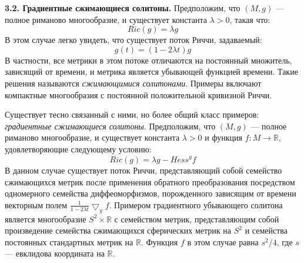 \textbf{3.2. Градиентные сжимающиеся солитоны.} Предположим, что 
$(M,g)$ — полное риманово многообразие, и существует константа 
$\lambda >0$, такая что:
\[
    Ric(g)=\lambda g
\]
В этом случае легко увидеть, что существует поток Риччи, задаваемый:
\[
    g(t)=(1-2\lambda t)g
\]
В частности, все метрики в этом потоке отличаются на постоянный множитель, 
зависящий от времени, и метрика является убывающей функцией времени. 
Такие решения называются \textit{сжимающимися солитонами}. Примеры включают 
компактные многообразия с постоянной положительной кривизной Риччи.

Существует тесно связанный с ними, но более общий класс примеров: 
\textit{градиентные сжимающиеся солитоны}. Предположим, что 
$(M,g)$ — полное риманово многообразие, и существует константа 
$\lambda >0$ и функция $f:M \rightarrow \mathbb{R}$, удовлетворяющие следующему условию:
\[
    Ric(g)=\lambda g - {Hess}^g f
\]
В данном случае существует поток Риччи, представляющий собой 
семейство сжимающихся метрик после применения обратного 
преобразования посредством одномерного семейства диффеоморфизмов, 
порожденного зависящим от времени векторным полем 
$\frac{1}{1-2\lambda t}{\bigtriangledown}_g f$. 
Примером градиентного убывающего солитона является многообразие 
$S^2 \times \mathbb{R}$ с семейством метрик, представляющим 
собой произведение семейства сжимающихся сферических метрик на 
$S^2$ и семейства постоянных стандартных метрик на $\mathbb{R}$. 
Функция $f$ в этом случае равна $s^2/4$, 
где $s$ — евклидова координата на $\mathbb{R}$.